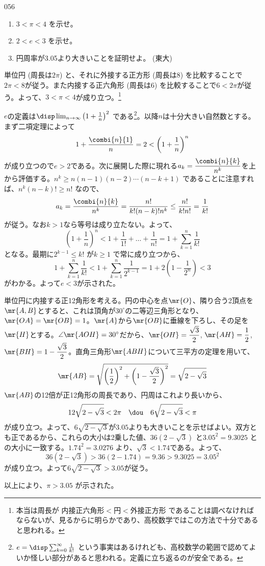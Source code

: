 \begin{prob}{056}{}{}
 \begin{enumerate}
  \item $3<\pi<4$ を示せ。
  \item $2<e<3$ を示せ。 
  \item 円周率が3.05より大きいことを証明せよ。  (東大)
 \end{enumerate}
\end{prob}
単位円 (周長は$2\pi$) と、それに外接する正方形 (周長は8) を比較することで$2\pi<8$が従う。また内接する正六角形 (周長は6) を比較することで$6<2\pi$が従う。よって、$3<\pi<4$が成り立つ。\footnote{本当は周長が 内接正六角形$<$円$<$外接正方形 であることは調べなければならないが、見るからに明らかであり、高校数学ではこの方法で十分であると思われる。}

$e$の定義は$\disp \lim_{n\to\infty} \left(1+\frac{1}{n}\right)^2$ である\footnote{$e=\disp \sum_{k=0}^\infty\frac{1}{k!}$ という事実はあるけれども、高校数学の範囲で認めてよいか怪しい部分があると思われる。定義に立ち返るのが安全である。}。以降$n$は十分大きい自然数とする。まず二項定理によって
\[ 1+\frac{\combi{n}{1}}{n}=2<\left(1+\frac{1}{n}\right)^n \]
が成り立つので$e>2$である。次に展開した際に現れる$a_k=\dfrac{\combi{n}{k}}{n^k}$を上から評価する。$n^k\ge n(n-1)(n-2)\cdots(n-k+1)$ であることに注意すれば、$n^k(n-k)!\ge n!$ なので、
\[ a_k=\frac{\combi{n}{k}}{n^k}=\frac{n!}{k!(n-k)!n^k}\le \frac{n!}{k!n!}=\frac{1}{k!} \]
が従う。なお$k>1$なら等号は成り立たない。よって、
\[ \left(1+\frac{1}{n}\right)^n<1+\frac{1}{1!}+\dots +\frac{1}{n!}=1+\sum_{k=1}^n \frac{1}{k!} \]
となる。最期に$2^{k-1}\le k!$ が$k\ge 1$ で常に成り立つから、
\[ 1+\sum_{k=1}^n\frac{1}{k!}<1+\sum_{k=1}^n \frac{1}{2^{k-1}}=1+2\left(1-\frac{1}{2^n}\right) < 3 \]
がわかる。よって$e<3$が示された。

単位円に内接する正12角形を考える。円の中心を点$\mr{O}$、隣り合う2頂点を$\mr{A,B}$とすると、これは頂角が$30^\circ$の二等辺三角形となり、$\mr{OA}=\mr{OB}=1$。$\mr{A}$から$\mr{OB}$に垂線を下ろし、その足を$\mr{H}$とする。$\angle\mr{AOH}=30^\circ$だから、$\mr{OH}=\dfrac{\sqrt{3}}{2}$, $\mr{AH}=\dfrac{1}{2}$, $\mr{BH}=1-\dfrac{\sqrt{3}}{2}$。直角三角形$\mr{ABH}$について三平方の定理を用いて、
\[ \mr{AB}=\sqrt{\left(\frac{1}{2}\right)^2+\left(1-\frac{\sqrt{3}}{2}\right)^2}=\sqrt{2-\sqrt{3}} \]
$\mr{AB}$の12倍が正12角形の周長であり、円周はこれより長いから、
\[ 12\sqrt{2-\sqrt{3}} < 2\pi \quad\dou\quad 6\sqrt{2-\sqrt{3}} < \pi \]
が成り立つ。よって、$6\sqrt{2-\sqrt{3}}$が$3.05$よりも大きいことを示せばよい。双方とも正であるから、これらの大小は2乗した値、$36(2-\sqrt{3})$ と$3.05^2=9.3025$ との大小に一致する。$1.74^2=3.0276$ より、$\sqrt{3}<1.74$である。よって、
\[ 36(2-\sqrt{3}) > 36(2-1.74)=9.36>9.3025=3.05^2 \]
が成り立つ。よって$6\sqrt{2-\sqrt{3}}>3.05$が従う。

以上により、$\pi > 3.05$ が示された。